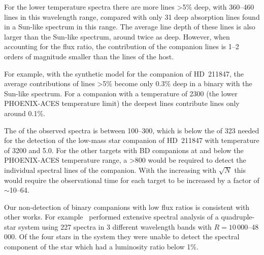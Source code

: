 For the lower temperature spectra there are more lines >5\% deep, with 360--460 lines in this wavelength range, compared with only 31 deep absorption lines found in a Sun-like spectrum in this range.
The average line depth of these lines is also larger than the Sun-like spectrum, around twice as deep.
However, when accounting for the flux ratio, the contribution of the companion lines is 1--2 orders of magnitude smaller than the lines of the host.

For example, with the synthetic model for the companion of {HD~211847}, the average contributions of lines >5\% become only 0.3\% deep in a binary with the Sun-like spectrum.
For a companion with a temperature of 2300\K{} (the lower {PHOENIX-ACES} temperature limit) the deepest lines contribute lines only around 0.1\%.


The \snr{} of the observed spectra is between 100--300, which is below the \snr{} of 323 needed for the detection of the low-mass star companion of {HD~211847} with temperature of 3200\K{} and \Logg{} 5.0.
For the other targets with {BD} companions at and below the {PHOENIX-ACES} temperature range, a \snr{} >800 would be required to detect the individual spectral lines of the companion.
With the \snr{} increasing with \(\sqrt{N}\) this would require the observational time for each target to be increased by a factor of \(\sim\)10--64.

Our non-detection of binary companions with low flux ratios is consistent with other works.
For example~\citet{nemravova_xtauri_2016} performed extensive spectral analysis of a quadruple-star system  using 227 spectra in 3 different wavelength bands with \(R=10\,000\)--48\,000.
Of the four stars in the system they were unable to detect the spectral component of the star which had a luminosity ratio below 1\%.




